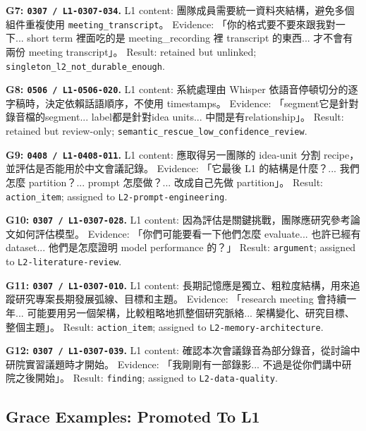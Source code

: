 \documentclass[11pt,a4paper]{article}
\newcommand{\code}[1]{{\footnotesize\texttt{#1}}}
\begin{document}
\textbf{G7: \code{0307 / L1-0307-034}.} L1 content: 團隊成員需要統一資料夾結構，避免多個組件重複使用 \code{meeting\_transcript}。 Evidence: 「你的格式要不要來跟我對一下... short term 裡面吃的是 meeting\_recording 裡 transcript 的東西... 才不會有兩份 meeting transcript」。 Result: retained but unlinked; \code{singleton\_l2\_not\_durable\_enough}.

\textbf{G8: \code{0506 / L1-0506-020}.} L1 content: 系統處理由 Whisper 依語音停頓切分的逐字稿時，決定依賴話語順序，不使用 timestamps。 Evidence: 「segment它是針對錄音檔的segment... label都是針對idea units... 中間是有relationship」。 Result: retained but review-only; \code{semantic\_rescue\_low\_confidence\_review}.

\textbf{G9: \code{0408 / L1-0408-011}.} L1 content: 應取得另一團隊的 idea-unit 分割 recipe，並評估是否能用於中文會議記錄。 Evidence: 「它最後 L1 的結構是什麼？... 我們怎麼 partition？... prompt 怎麼做？... 改成自己先做 partition」。 Result: \code{action\_item}; assigned to \code{L2-prompt-engineering}.

\textbf{G10: \code{0307 / L1-0307-028}.} L1 content: 因為評估是關鍵挑戰，團隊應研究參考論文如何評估模型。 Evidence: 「你們可能要看一下他們怎麼 evaluate... 也許已經有 dataset... 他們是怎麼證明 model performance 的？」 Result: \code{argument}; assigned to \code{L2-literature-review}.

\textbf{G11: \code{0307 / L1-0307-010}.} L1 content: 長期記憶應是獨立、粗粒度結構，用來追蹤研究專案長期發展弧線、目標和主題。 Evidence: 「research meeting 會持續一年... 可能要用另一個架構，比較粗略地抓整個研究脈絡... 架構變化、研究目標、整個主題」。 Result: \code{action\_item}; assigned to \code{L2-memory-architecture}.

\textbf{G12: \code{0307 / L1-0307-039}.} L1 content: 確認本次會議錄音為部分錄音，從討論中研院實習議題時才開始。 Evidence: 「我剛剛有一部錄影... 不過是從你們講中研院之後開始」。 Result: \code{finding}; assigned to \code{L2-data-quality}.

\subsection{Grace Examples: Promoted To L1}
\end{document}
